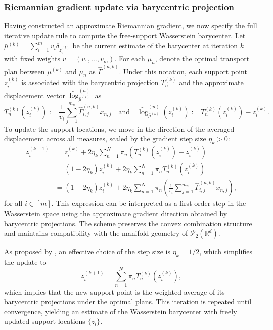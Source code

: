 \documentclass[11pt]{article}
\newcommand{\bbR}{\mathbb{R}}
\newcommand{\calP}{\mathcal{P}}
\begin{document}
\subsubsection{Riemannian gradient update via barycentric projection}
Having constructed an approximate Riemannian gradient, we now specify the full iterative update rule to compute the free-support Wasserstein barycenter. Let $\bar{\mu}^{(k)} = \sum_{i=1}^m v_i \delta_{z_i^{(k)}}$ be the current estimate of the barycenter at iteration $k$ with fixed weights $v = (v_1, \ldots, v_m)$. For each $\mu_n$, denote the optimal transport plan between $\bar{\mu}^{(k)}$ and $\mu_n$ as $\hat{\Gamma}^{(n,k)}$. Under this notation, each support point $z_i^{(k)}$ is associated with the barycentric projection $T_n^{(k)}$ and the approximate displacement vector $\widetilde{\log}_{\bar{\mu}^{(k)}}^{(n)}$ as 
\begin{equation*}
  T_n^{(k)}(z_i^{(k)}) := \frac{1}{v_i} \sum_{j=1}^{m_n} \hat{\Gamma}_{i,j}^{(n,k)} x_{n,j}\quad\text{and}\quad \widetilde{\log}_{\bar{\mu}^{(k)}}^{(n)}(z_i^{(k)}):= T_n^{(k)}(z_i^{(k)}) - z_i^{(k)}.
\end{equation*}
To update the support locations, we move in the direction of the averaged displacement across all measures, scaled by the gradient step size $\eta_k >0$:
\begin{equation}
    \begin{aligned}
    z_i^{(k+1)} &= z_i^{(k)} + 2\eta_k \sum_{n=1}^N \pi_n (T_n^{(k)} (z_i^{(k)}) - z_i^{(k)}) \\ 
    &= (1-2\eta_k)z_i^{(k)} + 2\eta_k \sum_{n=1}^N \pi_n T_n^{(k)} (z_i^{(k)}) \\ 
    &= (1-2\eta_k)z_i^{(k)} + 2\eta_k \sum_{n=1}^N \pi_n \left(\frac{1}{v_i} \sum_{j=1}^{m_n} \hat{\Gamma}_{i,j}^{(n,k)} x_{n,j}\right),
    \end{aligned}
\end{equation}
for all $i\in [m]$. This expression can be interpreted as a first-order step in the Wasserstein space using the approximate gradient direction obtained by barycentric projections. The scheme preserves the convex combination structure and maintains compatibility with the manifold geometry of $\calP_2(\bbR^d)$.

As proposed by \cite{zemel_2019_FrechetMeansProcrustes}, an effective choice of the step size is $\eta_k = 1/2$, which simplifies the update to 
\begin{equation*}
    z_i^{(k+1)} = \sum_{n=1}^N \pi_n T_n^{(k)}(z_i^{(k)}),
\end{equation*}
which implies that the new support point is the weighted average of its barycentric projections under the optimal plans. This iteration is repeated until convergence, yielding an estimate of the Wasserstein barycenter with freely updated support locations $\lbrace z_i\rbrace$.
\end{document}

